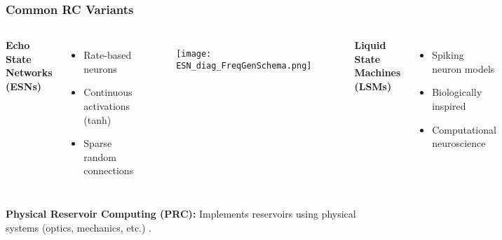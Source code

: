 \documentclass{beamer}
\begin{document}
\begin{frame}
    \frametitle{Common RC Variants}
    \begin{columns}[T]
            \textbf{Echo State Networks (ESNs)} \cite{article_esn_intro}
            \begin{itemize}
                \item Rate-based neurons
                \item Continuous activations (tanh)
                \item Sparse random connections
            \end{itemize}
            \begin{figure}
                \texttt{[image: ESN\_diag\_FreqGenSchema.png]}
            \end{figure}

            \textbf{Liquid State Machines (LSMs)} \cite{article_lsm_intro}
            \begin{itemize}
                \item Spiking neuron models
                \item Biologically inspired
                \item Computational neuroscience
            \end{itemize}
             \begin{figure}
                \texttt{[image: lsm\_diag.png]}
            \end{figure}
    \end{columns}
    \vspace{1em}
    \textbf{Physical Reservoir Computing (PRC):} Implements reservoirs using physical systems (optics, mechanics, etc.) \cite{Mandal2022}.
\end{frame}
\end{document}
